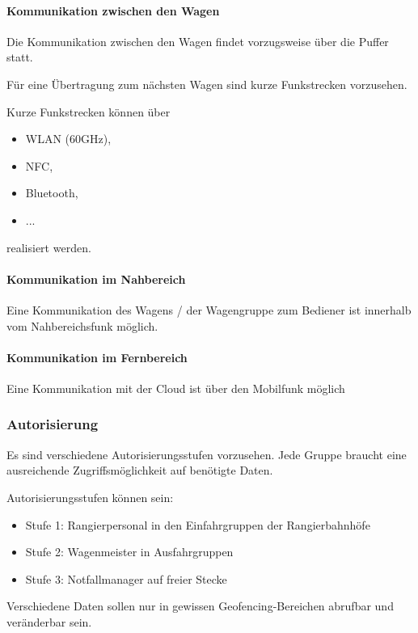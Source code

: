 \paragraph{Kommunikation zwischen den Wagen}
\begin{feat}
Die Kommunikation zwischen den Wagen findet vorzugsweise über die Puffer statt.
\end{feat}
\begin{feat}
Für eine Übertragung zum nächsten Wagen sind kurze Funkstrecken vorzusehen.
\end{feat}
\begin{rem}[zu Anf. 34]
Kurze Funkstrecken können über
\begin{itemize}
    \item WLAN (60GHz),
    \item NFC,
    \item Bluetooth,
    \item ...
\end{itemize}
realisiert werden.
\end{rem}

\paragraph{Kommunikation im Nahbereich}
\begin{feat}
Eine Kommunikation des Wagens / der Wagengruppe zum Bediener ist innerhalb vom Nahbereichsfunk möglich.
\end{feat}

\paragraph{Kommunikation im Fernbereich}
\begin{feat}
Eine Kommunikation mit der Cloud ist über den Mobilfunk möglich
\end{feat}

\subsubsection{Autorisierung}
\begin{feat}
Es sind verschiedene Autorisierungsstufen vorzusehen. Jede Gruppe braucht eine ausreichende Zugriffsmöglichkeit auf benötigte Daten.
\end{feat}
\begin{rem} [zu Anf. 37]
Autorisierungsstufen können sein:
\begin{itemize}
    \item Stufe 1: Rangierpersonal in den Einfahrgruppen der Rangierbahnhöfe
    \item Stufe 2: Wagenmeister in Ausfahrgruppen
    \item Stufe 3: Notfallmanager auf freier Stecke
\end{itemize}
\end{rem}
\begin{rem} [zu Anf. 37]
Verschiedene Daten sollen nur in gewissen Geofencing-Bereichen abrufbar und veränderbar sein.
\end{rem}

